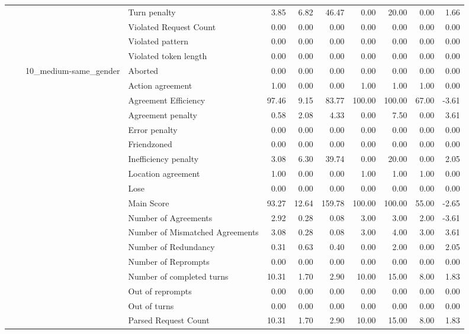 \begin{tabular}{llllrrrrrrr}
 &  &  & Turn penalty & 3.85 & 6.82 & 46.47 & 0.00 & 20.00 & 0.00 & 1.66 \\
 &  &  & Violated Request Count & 0.00 & 0.00 & 0.00 & 0.00 & 0.00 & 0.00 & 0.00 \\
 &  &  & Violated pattern & 0.00 & 0.00 & 0.00 & 0.00 & 0.00 & 0.00 & 0.00 \\
 &  &  & Violated token length & 0.00 & 0.00 & 0.00 & 0.00 & 0.00 & 0.00 & 0.00 \\
\cline{3-11}
 &  & \multirow[t]{27}{*}{10_medium-same_gender} & Aborted & 0.00 & 0.00 & 0.00 & 0.00 & 0.00 & 0.00 & 0.00 \\
 &  &  & Action agreement & 1.00 & 0.00 & 0.00 & 1.00 & 1.00 & 1.00 & 0.00 \\
 &  &  & Agreement Efficiency & 97.46 & 9.15 & 83.77 & 100.00 & 100.00 & 67.00 & -3.61 \\
 &  &  & Agreement penalty & 0.58 & 2.08 & 4.33 & 0.00 & 7.50 & 0.00 & 3.61 \\
 &  &  & Error penalty & 0.00 & 0.00 & 0.00 & 0.00 & 0.00 & 0.00 & 0.00 \\
 &  &  & Friendzoned & 0.00 & 0.00 & 0.00 & 0.00 & 0.00 & 0.00 & 0.00 \\
 &  &  & Inefficiency penalty & 3.08 & 6.30 & 39.74 & 0.00 & 20.00 & 0.00 & 2.05 \\
 &  &  & Location agreement & 1.00 & 0.00 & 0.00 & 1.00 & 1.00 & 1.00 & 0.00 \\
 &  &  & Lose & 0.00 & 0.00 & 0.00 & 0.00 & 0.00 & 0.00 & 0.00 \\
 &  &  & Main Score & 93.27 & 12.64 & 159.78 & 100.00 & 100.00 & 55.00 & -2.65 \\
 &  &  & Number of Agreements & 2.92 & 0.28 & 0.08 & 3.00 & 3.00 & 2.00 & -3.61 \\
 &  &  & Number of Mismatched Agreements & 3.08 & 0.28 & 0.08 & 3.00 & 4.00 & 3.00 & 3.61 \\
 &  &  & Number of Redundancy & 0.31 & 0.63 & 0.40 & 0.00 & 2.00 & 0.00 & 2.05 \\
 &  &  & Number of Reprompts & 0.00 & 0.00 & 0.00 & 0.00 & 0.00 & 0.00 & 0.00 \\
 &  &  & Number of completed turns & 10.31 & 1.70 & 2.90 & 10.00 & 15.00 & 8.00 & 1.83 \\
 &  &  & Out of reprompts & 0.00 & 0.00 & 0.00 & 0.00 & 0.00 & 0.00 & 0.00 \\
 &  &  & Out of turns & 0.00 & 0.00 & 0.00 & 0.00 & 0.00 & 0.00 & 0.00 \\
 &  &  & Parsed Request Count & 10.31 & 1.70 & 2.90 & 10.00 & 15.00 & 8.00 & 1.83 \\

\end{tabular}
